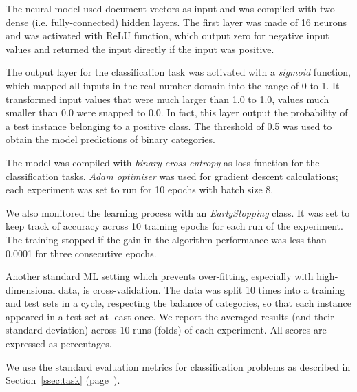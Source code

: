 The neural model used document vectors as input and was compiled with two dense (i.e. fully-connected) hidden layers. The first layer was  made of 16 neurons and was activated with \gls{ReLU} function, which output zero for negative input values and returned the input directly if the input was positive. 

The output layer for the classification task was activated with a \textit{sigmoid} function, which mapped all inputs in the real number domain into the range of 0 to 1. It transformed input values that were much larger than 1.0 to 1.0, values much smaller than 0.0 were snapped to 0.0. In fact, this layer output the probability of a test instance belonging to a positive class. The threshold of 0.5 was used to obtain the model predictions of binary categories. 


The model was compiled with \textit{binary cross-entropy} as loss function for the classification tasks. \textit{Adam optimiser} was used for gradient descent calculations; each experiment was set to run for 10 epochs with batch size 8.

We also monitored the learning process with an \textit{EarlyStopping} class. It was set to keep track of accuracy across 10 training epochs for each run of the experiment. The training stopped if the gain in the algorithm performance was less than 0.0001 for three consecutive epochs. 

Another standard ML setting which prevents over-fitting, especially with high-dimensional data, is cross-validation. 
The data was split 10 times into a training and test sets in a cycle, respecting the balance of categories, so that each instance appeared in a test set at least once. We report the averaged results (and their standard deviation) across 10 runs (folds) of each experiment. All scores are expressed as percentages. 

We use the standard evaluation metrics for classification problems as described in Section~\ref{ssec:task} (page~\pageref{pg:eval_setup}). 

